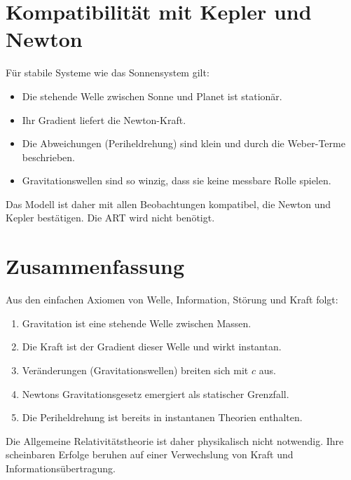 \documentclass[11pt]{article}
\begin{document}
\section{Kompatibilität mit Kepler und Newton}

Für stabile Systeme wie das Sonnensystem gilt:

\begin{itemize}
    \item Die stehende Welle zwischen Sonne und Planet ist stationär.
    \item Ihr Gradient liefert die Newton-Kraft.
    \item Die Abweichungen (Periheldrehung) sind klein und durch die Weber-Terme beschrieben.
    \item Gravitationswellen sind so winzig, dass sie keine messbare Rolle spielen.
\end{itemize}

Das Modell ist daher mit allen Beobachtungen kompatibel, die Newton und Kepler bestätigen. Die ART wird nicht benötigt.

\section{Zusammenfassung}

Aus den einfachen Axiomen von Welle, Information, Störung und Kraft folgt:

\begin{enumerate}
    \item Gravitation ist eine stehende Welle zwischen Massen.
    \item Die Kraft ist der Gradient dieser Welle und wirkt instantan.
    \item Veränderungen (Gravitationswellen) breiten sich mit \(c\) aus.
    \item Newtons Gravitationsgesetz emergiert als statischer Grenzfall.
    \item Die Periheldrehung ist bereits in instantanen Theorien enthalten.
\end{enumerate}

Die Allgemeine Relativitätstheorie ist daher physikalisch nicht notwendig. Ihre scheinbaren Erfolge beruhen auf einer Verwechslung von Kraft und Informationsübertragung.
\end{document}
